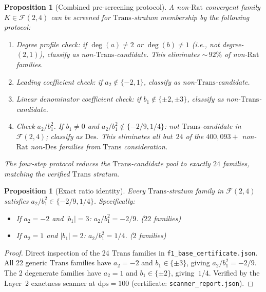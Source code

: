 \documentclass[12pt, reqno]{amsart}
\newtheorem{proposition}[theorem]{Proposition}
\theoremstyle{definition}
\theoremstyle{remark}
\newcommand{\Rat}{\mathrm{Rat}}
\newcommand{\Trans}{\mathrm{Trans}}
\newcommand{\Des}{\mathrm{Des}}
\begin{document}
\begin{proposition}[Combined pre-screening protocol]\label{prop:protocol}
A non-$\Rat$ convergent
family $K \in \mathcal{F}(2,4)$ can be screened for $\Trans$-stratum membership by the following
protocol:
\begin{enumerate}[\upshape(i)]
\item Degree profile check: if $\deg(a) \ne 2$ or $\deg(b) \ne 1$ (i.e., not degree-$(2,1)$),
     classify as non-$\Trans$-candidate. This eliminates ${\sim}\,92\%$ of non-$\Rat$ families.
\item Leading coefficient check: if $a_2 \notin \{-2, 1\}$, classify as non-$\Trans$-candidate.
\item Linear denominator coefficient check: if $b_1 \notin \{\pm 2, \pm 3\}$, classify as
      non-$\Trans$-candidate.
\item Check $a_2/b_1^2$. If $b_1 \ne 0$ and $a_2/b_1^2 \notin \{-2/9, 1/4\}$:
     not $\Trans$-candidate in $\mathcal{F}(2,4)$; classify as $\Des$.
     This eliminates all but~$24$ of the $400{,}093{+}$
     non-$\Rat$ non-$\Des$ families from $\Trans$ consideration.
\end{enumerate}
The four-step protocol reduces the $\Trans$-candidate pool to exactly $24$ families,
matching the verified $\Trans$ stratum.
\end{proposition}

\begin{proposition}[Exact ratio identity]\label{prop:exactratio}
Every $\Trans$-stratum family in $\mathcal{F}(2,4)$ satisfies
$a_2/b_1^2 \in \{-2/9, 1/4\}$. Specifically:
\begin{itemize}
\item If $a_2 = -2$ and $|b_1| = 3$: $a_2/b_1^2 = -2/9$. ($22$ families)
\item If $a_2 = 1$ and $|b_1| = 2$: $a_2/b_1^2 = 1/4$. ($2$ families)
\end{itemize}
\end{proposition}

\begin{proof}
Direct inspection of the 24 $\Trans$ families in
\texttt{f1\_base\_certificate.json}. All 22 generic $\Trans$ families
have $a_2 = -2$ and $b_1 \in \{\pm 3\}$, giving $a_2/b_1^2 = -2/9$.
The 2 degenerate families have $a_2 = 1$ and $b_1 \in \{\pm 2\}$,
giving~$1/4$. Verified by the Layer~2 exactness scanner
at $\mathrm{dps}=100$ (certificate: \texttt{scanner\_report.json}).
\end{proof}
\end{document}

